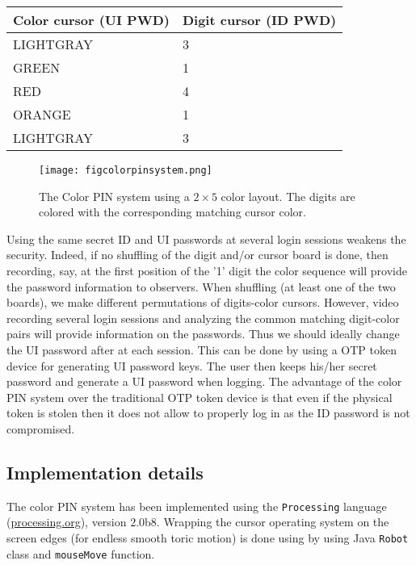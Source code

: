 \documentclass[12pt,onecolumn]{article}
\begin{document}
\begin{center}
 \begin{tabular}{ll}
 Color cursor (UI PWD) & Digit cursor (ID PWD) \\ \hline\hline
 LIGHTGRAY& 3\\
  GREEN& 1 \\
   RED& 4\\
    ORANGE& 1\\
     LIGHTGRAY & 3
     \end{tabular}
     \end{center}


  

\begin{figure}
\centering
\texttt{[image: figcolorpinsystem.png]}

\caption{\label{fig:colorPIN}The Color PIN system using a $2\times 5$ color layout. The digits are colored with the corresponding matching cursor color.}
\end{figure}

Using the same secret ID and UI passwords at several login sessions weakens the security.
Indeed, if no shuffling of the digit and/or cursor board is done, then recording, say, at the first position of the '1' digit the color sequence will provide the password information to observers. When shuffling (at least one of the two boards), we make different permutations of digits-color cursors.
However, video recording several login sessions and analyzing the common matching digit-color pairs will provide information on the passwords.
Thus we should ideally change the UI password after at each session. This can be done by using a OTP token device for generating UI password keys.
The user then keeps his/her secret password and generate a UI password when logging. The advantage of the color PIN system over the traditional OTP token device is that even if the physical token is stolen then it does not allow to properly log in as the ID password is not compromised.



\subsection{Implementation details}
The color PIN system has been implemented using the {\tt Processing} language (\url{processing.org}), version 2.0b8.
Wrapping the cursor operating system on the screen edges (for endless smooth toric motion) is done using by using Java\texttrademark{} {\tt Robot} class and {\tt mouseMove} function.
 
\end{document}
